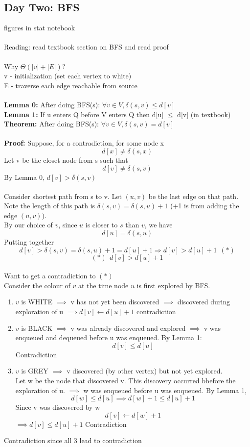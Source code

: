 \documentclass{article}
\begin{document}
	\subsection{Day Two: BFS}
	figures in stat notebook\\\\
	Reading: read textbook section on BFS and read proof\\\\
	Why $\Theta(|v| + |E|)$?\\
	v - initialization (set each vertex to white)\\
	E - traverse each edge reachable from source\\\\
	\textbf{Lemma 0:} After doing BFS(s): $\forall v\in V, \delta(s,v)\le d[v]$\\
	\textbf{Lemma 1:} If u enters Q before V enters Q then d[u] $\le$ d[v] (in textbook)\\
	\textbf{Theorem:} After doing BFS(s): $\forall v\in V, \delta(s,v) = d[v]$\\\\
	\textbf{Proof:} Suppose, for a contradiction, for some node x $$d[x] \neq \delta(s,x)$$
	Let v be the closet node from s such that $$d[v] \neq \delta(s,v)$$
	By Lemma 0, $d[v] > \delta(s,v)$\\\\
	Consider shortest path from s to v. Let $(u,v)$ be the last edge on that path. Note the length of this path is $\delta(s,v) = \delta(s,u) + 1$ (+1 is from adding the edge $(u,v)$). \\
	By our choice of $v$, since $u$ is closer to $s$ than $v$, we have $$d[u] = \delta(s,u)$$
	Putting together $$d[v] > \delta(s,v) = \delta(s,u) + 1 = d[u] + 1 \Rightarrow d[v] > d[u] + 1 ~~(*)$$
	$$(*) ~~ d[v] > d[u] + 1$$\\
	Want to get a contradiction to $(*)$\\
	Consider the colour of $v$ at the time node $u$ is first explored by BFS.\\
	\begin{enumerate}
		\item $v$ is WHITE $\implies$ v has not yet been discovered $\implies$ discovered during exploration of u $\implies d[v] \leftarrow d[u] + 1$ contradiction
		\item $v$ is BLACK $\implies$ v was already discovered and explored $\implies$ v was enqueued and dequeued before u was enqueued. By Lemma 1: $$d[v] \le d[u]$$ Contradiction
		\item $v$ is GREY $\implies$ v discovered (by other vertex)  but not yet explored.\\
		Let w be the node that discovered v. This discovery occurred bbefore the exploration of u. $\implies$ w was enqueued before u was enqueued. By Lemma 1, $$d[w]\le d[u] \implies d[w] + 1 \le d[u] + 1$$ Since v was discovered by w $$d[v] \leftarrow d[w] + 1$$ $\implies d[v] \le d[u] + 1$ Contradiction\\
	\end{enumerate}
	Contradiction since all 3 lead to contradiction\\\\
	
\end{document}
